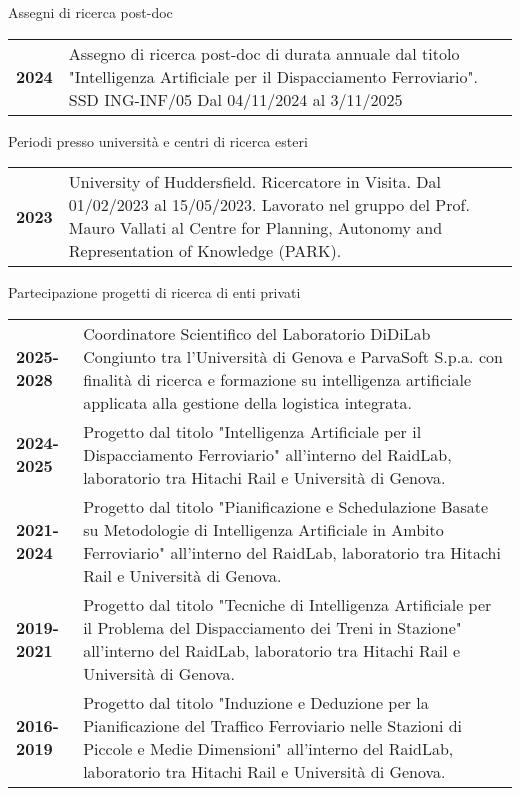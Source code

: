 \documentclass{resume} %
\begin{document}
\begin{rSection}{Assegni di ricerca post-doc}
	\begin{tabularx}{0.95\textwidth} {lp{14cm}}
 \textbf{2024} & Assegno di ricerca post-doc di durata annuale dal titolo "Intelligenza Artificiale per il Dispacciamento Ferroviario". SSD ING-INF/05 Dal 04/11/2024 al 3/11/2025
 \end{tabularx}
\end{rSection}

\begin{rSection}{Periodi presso università e centri di ricerca esteri}
	\begin{tabularx}{0.95\textwidth} {lp{14cm}}
 \textbf{2023} & University of Huddersfield. Ricercatore in Visita. Dal 01/02/2023 al 15/05/2023. Lavorato nel gruppo del Prof. Mauro Vallati al Centre for Planning, Autonomy and Representation of Knowledge (PARK).
 \end{tabularx}
\end{rSection}

\begin{rSection}{Partecipazione progetti di ricerca di enti privati}
	\begin{tabularx}{0.95\textwidth} {lp{14cm}}
 	\textbf{2025-2028} & Coordinatore Scientifico del Laboratorio DiDiLab Congiunto tra l'Università di Genova e ParvaSoft S.p.a. con finalità di ricerca e formazione su intelligenza artificiale applicata alla gestione della logistica integrata. \\
 	\textbf{2024-2025} & Progetto dal titolo "Intelligenza Artificiale per il Dispacciamento Ferroviario" all'interno del RaidLab, laboratorio tra Hitachi Rail e Università di Genova. \\
  	\textbf{2021-2024} & Progetto dal titolo "Pianificazione e Schedulazione Basate su Metodologie di Intelligenza Artificiale in Ambito Ferroviario" all'interno del RaidLab, laboratorio tra Hitachi Rail e Università di Genova. \\
   	\textbf{2019-2021} & Progetto dal titolo "Tecniche di Intelligenza Artificiale per il Problema del Dispacciamento dei Treni in Stazione" all'interno del RaidLab, laboratorio tra Hitachi Rail e Università di Genova.\\
    \textbf{2016-2019} & Progetto dal titolo "Induzione e Deduzione per la Pianificazione del Traffico Ferroviario nelle Stazioni di Piccole e Medie Dimensioni" all'interno del RaidLab, laboratorio tra Hitachi Rail e Università di Genova.\\
 \end{tabularx}
\end{rSection}
\end{document}
